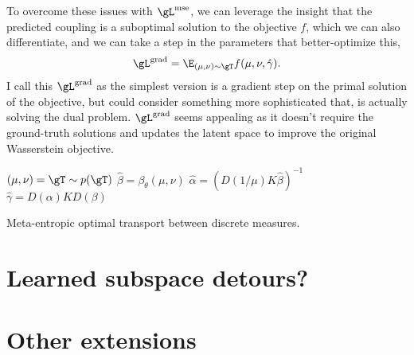 To overcome these issues with $\gL^{\rm mse}$, we can leverage the insight
that the predicted coupling is a suboptimal solution to the objective $f$,
which we can also differentiate, and we can take a step in the
parameters that better-optimize this, \ie
\begin{equation}
  \gL^{\rm grad} = \E_{(\mu,\nu)\sim\gT} f(\mu, \nu, \hat\gamma).
\end{equation}
I call this $\gL^{\rm grad}$ as the simplest version is a gradient step
on the primal solution of the objective, but could consider something more
sophisticated that, \eg is actually solving the dual problem.
$\gL^{\rm grad}$ seems appealing as it doesn't require the ground-truth
solutions and updates the latent space to improve the original
Wasserstein objective.



\begin{algorithm}[h]
  \begin{algorithmic}
    \State $(\mu,\nu)=\gT\sim p(\gT)$
    \State $\hat\beta=\beta_\theta(\mu, \nu)$
    \State $\hat\alpha=(D(1/\mu)K\hat\beta)^{-1}$
    \State $\hat\gamma=D(\alpha)KD(\beta)$
  \end{algorithmic}
  \caption{Meta-entropic optimal transport between discrete measures.
    }
  \label{alg:meta-entropic}
\end{algorithm}

\section{Learned subspace detours?}
\todoc
\citep{muzellec2019subspace,bonet2021subspace}

\section{Other extensions}
\todoc

